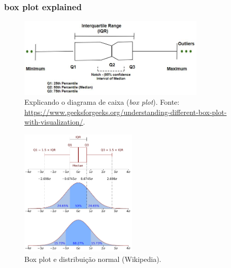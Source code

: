 \begin{frame}[allowframebreaks]
\frametitle{box plot explained}

\begin{figure}[h]
 \centering
  \includegraphics[width=0.8\textwidth,height=0.6\textheight,keepaspectratio]{figures/fake-data-notch-boxplot.jpg}
 \caption{Explicando o diagrama de caixa (\emph{box plot}). Fonte: \url{https://www.geeksforgeeks.org/understanding-different-box-plot-with-visualization/}.}
 \label{fig-boxplot-explained}
\end{figure}

\framebreak

\begin{figure}[h]
 \centering
  \includegraphics[width=0.5\textwidth,height=0.72\textheight,keepaspectratio]{figures/Boxplot_vs_PDF.pdf}
 \caption{Box plot e distribuição normal (Wikipedia).}
 \label{fig-boxplot-normal}
\end{figure}


\end{frame}



